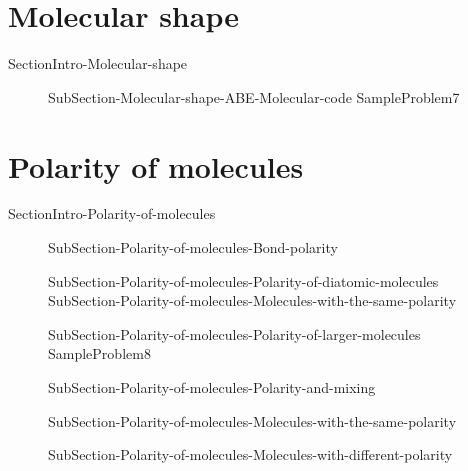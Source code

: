 \documentclass[main.tex]{subfiles}
\newcommand\chapterlabel{ChMIX-bond}\setcounter{figurenewcounter}{0}\setcounter{tablenewcounter}{0}\setcounter{formulanewcounter}{0}
\begin{document}
\section{Molecular shape}{SectionIntro-Molecular-shape}
\sloppy\begin{description}
\item[] {SubSection-Molecular-shape-ABE-Molecular-code}
\newpage\vspace{5cm}{Table-Molecular-geometries}
{SampleProblem7}
\end{description}
\section{Polarity of molecules}{SectionIntro-Polarity-of-molecules}
\sloppy \begin{description}
\item[] {SubSection-Polarity-of-molecules-Bond-polarity}
\item[] {SubSection-Polarity-of-molecules-Polarity-of-diatomic-molecules}
{SubSection-Polarity-of-molecules-Molecules-with-the-same-polarity}
\item[] {SubSection-Polarity-of-molecules-Polarity-of-larger-molecules}
{SampleProblem8}
\item[] {SubSection-Polarity-of-molecules-Polarity-and-mixing}
\item[] {SubSection-Polarity-of-molecules-Molecules-with-the-same-polarity}
\item[] {SubSection-Polarity-of-molecules-Molecules-with-different-polarity}
\end{description}
\end{document}
